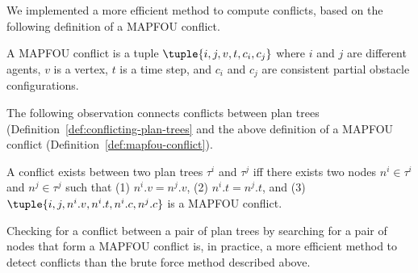 We implemented a more efficient method to compute conflicts, based on the following definition of a MAPFOU conflict. 
\begin{definition}
A MAPFOU conflict is a tuple $\tuple{i,j,v,t,c_i,c_j}$ 
where $i$ and $j$ are different agents, 
$v$ is a vertex,
$t$ is a time step, 
and $c_i$ and $c_j$ are consistent partial obstacle configurations.
\label{def:mapfou-conflict}
\end{definition}

The following observation connects conflicts between plan trees (Definition~\ref{def:conflicting-plan-trees} and the above definition of a MAPFOU conflict (Definition~\ref{def:mapfou-conflict}).  
\begin{observation}
A conflict exists between two plan trees $\tau^i$ and $\tau^j$ 
iff there exists two nodes $n^i\in\tau^i$ and $n^j\in\tau^j$ such that 
(1) $n^i.v = n^j.v$, 
(2) $n^i.t = n^j.t$, 
and (3) $\tuple{i,j,n^i.v,n^i.t,n^i.c, n^j.c}$ is a MAPFOU conflict.
\label{obs:conditionsForConflicts}
\end{observation} 
Checking for a conflict between a pair of plan trees by searching for a pair of nodes that form a MAPFOU conflict is, in practice, a more efficient method to detect conflicts than the brute force method described above. 
